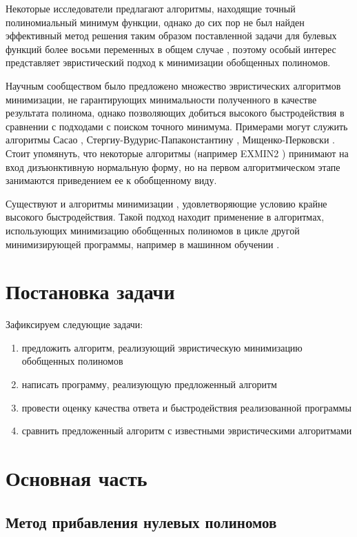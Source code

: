 \documentclass[a4paper,12pt,titlepage]{article}
\begin{document}
Некоторые исследователи предлагают алгоритмы, находящие точный полиномиальный минимум \cite{min-tau,exact6,exact} функции, однако до сих пор не был найден эффективный метод решения таким образом поставленной задачи для булевых функций более восьми переменных в общем случае \cite{exact8}, поэтому особый интерес представляет эвристический подход к минимизации обобщенных полиномов.

Научным сообществом было предложено множество эвристических алгоритмов минимизации, не гарантирующих минимальности полученного в качестве результата полинома, однако позволяющих добиться высокого быстродействия в сравнении с подходами с поиском точного минимума. Примерами могут служить алгоритмы Сасао \cite{exmin2}, Стергиу-Вудурис-Папаконстантину \cite{mvesopmin}, Мищенко-Перковски \cite{exorcism4}. Стоит упомянуть, что некоторые алгоритмы (например \textsc{EXMIN2} \cite{exmin2}) принимают на вход дизъюнктивную нормальную форму, но на первом алгоритмическом этапе занимаются приведением ее к обобщенному виду.

Существуют и алгоритмы минимизации \cite{exorcism-mv3}, удовлетворяющие условию крайне высокого быстродействия. Такой подход находит применение в алгоритмах, использующих минимизацию обобщенных полиномов в цикле другой минимизирующей программы, например в машинном обучении \cite{machine-learning}.

\section{Постановка задачи}

Зафиксируем следующие задачи:
\begin{enumerate}
    \item предложить алгоритм, реализующий эвристическую минимизацию обобщенных полиномов
    \item написать программу, реализующую предложенный алгоритм
    \item провести оценку качества ответа и быстродействия реализованной программы
    \item сравнить предложенный алгоритм с известными эвристическими алгоритмами
\end{enumerate}

\section{Основная часть}

\subsection{Метод прибавления нулевых полиномов}
\end{document}
